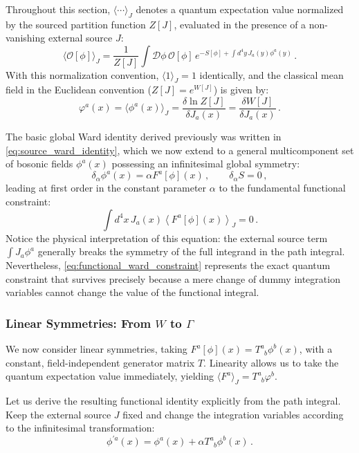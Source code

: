 Throughout this section, \(\langle \cdots \rangle_J\) denotes a quantum expectation value normalized by the sourced partition function \(Z[J]\), evaluated in the presence of a non-vanishing external source \(J\):
\[\boxed{\langle \mathcal{O}[\phi] \rangle_J = \frac{1}{Z[J]} \int \mathcal{D}\phi \, \mathcal{O}[\phi] \, e^{-S[\phi] + \int d^4y \, J_a(y)\phi^a(y)}} \, .\]
With this normalization convention, \(\langle 1 \rangle_J = 1\) identically, and the classical mean field in the Euclidean convention (\(Z[J] = e^{W[J]}\)) is given by:
\[\varphi^a(x) = \langle \phi^a(x) \rangle_J = \frac{\delta \ln Z[J]}{\delta J_a(x)} = \frac{\delta W[J]}{\delta J_a(x)} \, .\]

The basic global Ward identity derived previously was written in \eqref{eq:source_ward_identity}, which we now extend to a general multicomponent set of bosonic fields \(\phi^a(x)\) possessing an infinitesimal global symmetry:
\begin{equation} \label{eq:multicomponent_global_sym}
    \delta_\alpha \phi^a(x) = \alpha F^a[\phi](x) \, , \qquad \delta_\alpha S = 0 \, ,
\end{equation}
leading at first order in the constant parameter \(\alpha\) to the fundamental functional constraint:
\begin{equation} \label{eq:functional_ward_constraint}
    \boxed{\int d^4x \, J_a(x) \left\langle F^a[\phi](x) \right\rangle_J = 0} \, .
\end{equation}
Notice the physical interpretation of this equation: the external source term \(\int J_a \phi^a\) generally breaks the symmetry of the full integrand in the path integral. Nevertheless, \eqref{eq:functional_ward_constraint} represents the exact quantum constraint that survives precisely because a mere change of dummy integration variables cannot change the value of the functional integral.

\subsubsection{Linear Symmetries: From \(W\) to \(\Gamma\)}

We now consider linear symmetries, taking \(F^a[\phi](x) = T^a_{\phantom{a}b}\phi^b(x)\), with a constant, field-independent generator matrix \(T\). Linearity allows us to take the quantum expectation value immediately, yielding \(\langle F^a \rangle_J = T^a_{\phantom{a}b}\varphi^b\).

Let us derive the resulting functional identity explicitly from the path integral. Keep the external source \(J\) fixed and change the integration variables according to the infinitesimal transformation:
\begin{equation} \label{eq:linear_field_change}
    \phi^{\prime a}(x) = \phi^a(x) + \alpha T^a_{\phantom{a}b}\phi^b(x) \, .
\end{equation}

